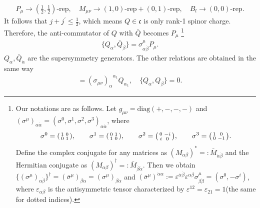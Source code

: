 \documentclass[a4paper,12pt]{article}
\def\nn{\nonumber}
\def\ua{\alpha}
\def\da{\dot{\alpha}}
\def\ub{\beta}
\def\db{\dot{\beta}}
\theoremstyle{plain}
\theoremstyle{definition}
\begin{document}
\begin{align}
P_\mu \rightarrow \left(\frac12,\frac12 \right)\text{-rep},\quad M_{\mu\nu} \rightarrow \left(1,0\right)\text{-rep} +\left(0,1\right)\text{-rep},\quad B_l \rightarrow \left(0,0\right)\text{-rep}. \nn
\end{align}
It follows that $j+j^\prime \leq \frac{1}{2}$, which means $Q \in \mathfrak{c}$ is only rank-1 spinor charge. 
Therefore, the anti-commutator of $Q$ with $\bar{Q}$ becomes $P_{\mu}$
\footnote{
Our notations are as follows. Let $g_{\mu\nu}=\mathrm{diag}(+,-,-,-)$ and $(\sigma^\mu)_{\ua\da}=(\sigma^0,\sigma^1,\sigma^2,\sigma^3)_{\ua\da}$, where
\begin{align*}
 \sigma^0=\smqty(\pmat{0}),\qquad
\sigma^1= \smqty(\pmat{1})
,\qquad
\sigma^2= \smqty(\pmat{2})
,\qquad
\sigma^3= \smqty(\pmat{3}).
\end{align*}
Define the complex conjugate for any matrices as $(M_{\ua\ub})^\ast=:\bar M_{\da\db}$ and the Hermitian conjugate as $(M_{\ua\ub})^\dag =:\bar M_{\db\da}$. Then we obtain $\{(\sigma^\mu)_{\ua\db}\}^\dag= (\bar \sigma^\mu)_{\ub\da}=(\sigma^\mu)_{\ub\da}$ and $(\bar \sigma^\mu)^{\da\ua}:=\varepsilon^{\da\db}\varepsilon^{\ua\ub}\sigma^\mu_{\ub\db}=(\sigma^0,-\sigma^i)$, where $\varepsilon_{\ua\ub}$ is the antisymmetric tensor characterized by $\varepsilon^{12}=\varepsilon_{21}=1$(the same for dotted indices). 
}
\begin{align}
\{ Q_{\ua}, \bar{Q}_{\db} \}= \sigma^\mu_{\ua\db}P_{\mu}.
\end{align}
$Q_\alpha, \bar Q_{\da}$ are the supersymmetry generators.
The other relations are obtained in the same way
\begin{align}
[Q_\ua, M_{\mu \nu}]= {(\sigma_{\mu\nu})_\alpha}^{\ua_1} Q_{\ua_1}, \quad
\{Q_\ua,Q_\ub\}=0.
\end{align}
\end{document}
